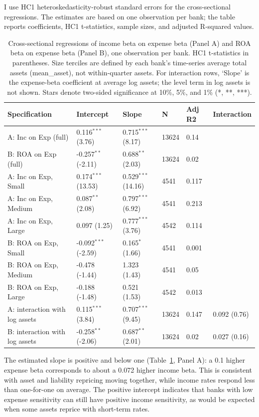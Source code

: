 \documentclass[11pt]{article}
\begin{document}
I use HC1 heteroskedasticity-robust standard errors for the
cross-sectional regressions. The estimates are based on one observation per
bank; the table reports coefficients, HC1 t-statistics, sample sizes, and
adjusted R-squared values.

\begin{table}[H]\centering\small
\caption{Cross-sectional regressions of income beta on expense beta (Panel A)
and ROA beta on expense beta (Panel B), one observation per bank. HC1
t-statistics in parentheses. Size terciles are defined by each bank's
time-series average total assets (mean\_asset), not within-quarter assets.
For interaction rows, `Slope' is the expense-beta coefficient at average log
assets; the level term in log assets is not shown. Stars denote two-sided
significance at 10\%, 5\%, and 1\% (*, **, ***).}\label{tab:t3}
\begin{tabular}{llllll}\toprule
Specification & Intercept & Slope & N & Adj R2 & Interaction\\
\midrule
A: Inc on Exp (full) & 0.116$^{***}$ (3.76) & 0.715$^{***}$ (8.17) & 13624 & 0.14 & \\
B: ROA on Exp (full) & -0.257$^{**}$ (-2.11) & 0.688$^{**}$ (2.03) & 13624 & 0.02 & \\
A: Inc on Exp, Small & 0.174$^{***}$ (13.53) & 0.529$^{***}$ (14.16) & 4541 & 0.117 & \\
A: Inc on Exp, Medium & 0.087$^{**}$ (2.08) & 0.797$^{***}$ (6.92) & 4541 & 0.213 & \\
A: Inc on Exp, Large & 0.097 (1.25) & 0.777$^{***}$ (3.76) & 4542 & 0.114 & \\
B: ROA on Exp, Small & -0.092$^{***}$ (-2.59) & 0.165$^{*}$ (1.66) & 4541 & 0.001 & \\
B: ROA on Exp, Medium & -0.478 (-1.44) & 1.323 (1.43) & 4541 & 0.05 & \\
B: ROA on Exp, Large & -0.188 (-1.48) & 0.521 (1.53) & 4542 & 0.013 & \\
A: interaction with log assets & 0.115$^{***}$ (3.84) & 0.707$^{***}$ (9.45) & 13624 & 0.147 & 0.092 (0.76)\\
B: interaction with log assets & -0.258$^{**}$ (-2.06) & 0.687$^{**}$ (2.01) & 13624 & 0.02 & 0.027 (0.16)\\
\bottomrule
\end{tabular}
\end{table}

The estimated slope is positive and below one (Table~\ref{tab:t3},
Panel A): a 0.1 higher expense beta corresponds to about a 0.072 higher income
beta. This is consistent with asset and liability repricing moving together,
while income rates respond less than one-for-one on average. The positive
intercept indicates that banks with low expense sensitivity can still have
positive income sensitivity, as would be expected when some assets reprice
with short-term rates.
\end{document}
